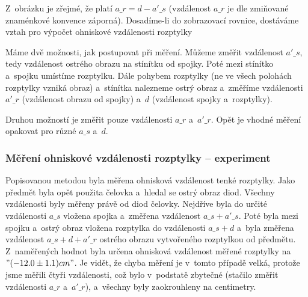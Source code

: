 {

Z~obrázku je zřejmé, že platí $ a\_r = d - a'\_s $ (vzdálenost $ a\_r $ je dle
zmiňované znaménkové konvence záporná). Dosadíme-li do zobrazovací rovnice,
dostáváme vztah pro výpočet ohniskové vzdálenosti rozptylky

Máme dvě možnosti, jak postupovat při měření. Můžeme změřit vzdálenost $ a'\_s $,
tedy vzdálenost ostrého obrazu na stínítku od spojky. Poté mezi stínítko
a~spojku umístíme rozptylku. Dále pohybem rozptylky (ne ve všech polohách
rozptylky vzniká obraz) a~stínítka nalezneme ostrý obraz a~změříme vzdálenosti $
a'\_r $ (vzdálenost obrazu od spojky) a~$ d $ (vzdálenost spojky a~rozptylky).

Druhou možností je změřit pouze vzdálenosti $ a\_r $ a~$ a'\_r $.
Opět je vhodné měření opakovat pro různé $ a\_s $ a~$ d $.

\subsubsection{Měření ohniskové vzdálenosti rozptylky -- experiment}

Popisovanou metodou byla měřena ohnisková vzdálenost tenké rozptylky. Jako
předmět byla opět použita čelovka a~hledal se ostrý obraz diod. Všechny
vzdálenosti byly měřeny právě od diod čelovky. Nejdříve byla do určité
vzdálenosti $ a\_s $ vložena spojka a~změřena vzdálenost $ a\_s + a'\_s $. Poté
byla mezi spojku a~ostrý obraz vložena rozptylka do vzdálenosti $ a\_s + d $
a~byla změřena vzdálenost $ a\_s + d + a'\_r $ ostrého obrazu vytvořeného rozptylkou
od předmětu. Z~naměřených hodnot byla určena ohnisková vzdálenost měřené
rozptylky na~$"(-12.0\pm1.1) cm"$. Je vidět, že chyba měření je
v~tomto případě velká, protože jsme měřili čtyři vzdálenosti, což bylo v~podstatě
zbytečné (stačilo změřit vzdálenosti $ a\_r $ a~$ a'\_r $), a~všechny byly
zaokrouhleny na centimetry.

}
